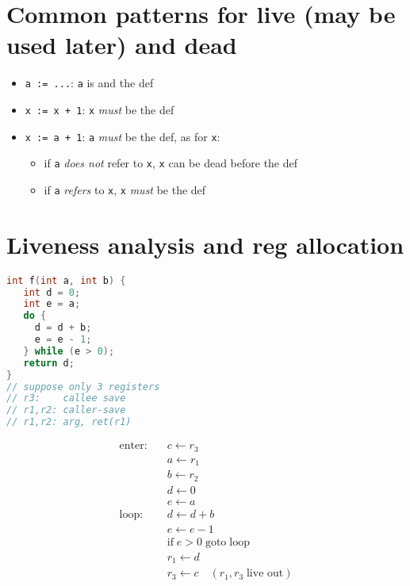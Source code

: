 \section*{Common patterns for live (may be used later) and dead}
\begin{itemize}
\item \texttt{a := ...}: \texttt{a} is  and  the def
\item \texttt{x := x + 1}: \texttt{x} \emph{must} be  the def
\item \texttt{x := a + 1}: \texttt{a} \emph{must} be  the def, as for \texttt{x}:
  \begin{itemize}[leftmargin=1em]
  \item if \texttt{a} \emph{does not} refer to \texttt{x}, \texttt{x} can be dead before the def
  \item if \texttt{a} \emph{refers} to \texttt{x}, \texttt{x} \emph{must} be  the def
  \end{itemize}
\end{itemize}

\section*{Liveness analysis and reg allocation}
\begin{minipage}{.5\linewidth}
\begin{lstlisting}[language=C,frame=none]
int f(int a, int b) {
   int d = 0;
   int e = a;
   do {
     d = d + b;
     e = e - 1;
   } while (e > 0);
   return d;
}
// suppose only 3 registers
// r3:    callee save
// r1,r2: caller-save
// r1,r2: arg, ret(r1)
\end{lstlisting}
\end{minipage}
\begin{minipage}{.5\linewidth}
  \begin{align*}
    \text{enter:}\quad & c \leftarrow r_3 \\
                       & a \leftarrow r_1 \\
                       & b \leftarrow r_2 \\
                       & d \leftarrow 0 \\
                       & e \leftarrow a \\
     \text{loop:}\quad & d \leftarrow d+b \\
                       & e \leftarrow e-1 \\
                       & \text{if}\; e > 0\; \text{goto}\;\text{loop}\\
                       & r_1 \leftarrow d \\
                       & r_3 \leftarrow c\quad (r_1,r_3\; \text{live out})
  \end{align*}
\end{minipage}

